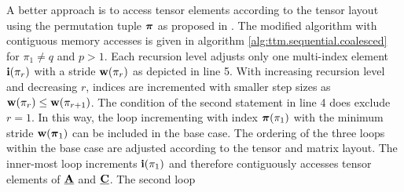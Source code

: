 A better approach is to access tensor elements according to the tensor layout using the permutation tuple $\boldsymbol{\pi}$ as proposed in \cite{bassoy:2018:fast}.
The modified algorithm with contiguous memory accesses is given in algorithm \ref{alg:ttm.sequential.coalesced} for $\pi_1 \neq q$ and $p > 1$.
Each recursion level adjusts only one multi-index element $\mathbf{i}(\pi_r)$ with a stride $\mathbf{w}(\pi_r)$ as depicted in line 5.
With increasing recursion level and decreasing $r$, indices are incremented with smaller step sizes as $\mathbf{w}(\pi_r) \leq \mathbf{w}(\pi_{r+1})$. 
The condition of the second  statement in line 4 does exclude $r=1$.
In this way, the loop incrementing with index $\boldsymbol{\pi}(\pi_1)$ with the minimum stride $\mathbf{w}(\boldsymbol{\pi}_1)$ can be included in the base case. 
The ordering of the three loops within the base case are adjusted according to the tensor and matrix layout.
The inner-most loop increments $\mathbf{i}(\pi_1)$ and therefore contiguously accesses tensor elements of $\underline{\mathbf{A}}$ and $\underline{\mathbf{C}}$.
The second loop 


